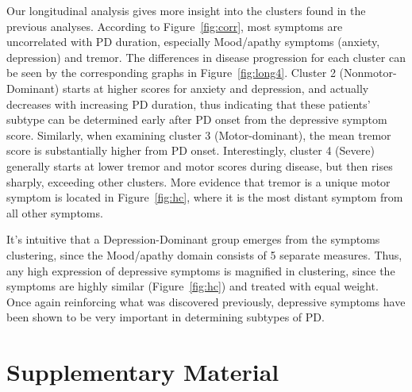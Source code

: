 \documentclass[preprint,5p]{elsarticle} %
\begin{document}
Our longitudinal analysis gives more insight into the clusters found in the previous analyses.
According to Figure~\ref{fig:corr}, most symptoms are uncorrelated with PD duration, especially
Mood/apathy symptoms (anxiety, depression) and tremor.
The differences in disease progression for each cluster can be seen by the corresponding graphs in
Figure~\ref{fig:long4}. Cluster 2 (Nonmotor-Dominant) starts at higher
scores for anxiety and depression, and actually decreases with increasing PD duration, thus indicating that these patients' subtype can be determined
early after PD onset from the depressive symptom score. Similarly, when examining cluster 3
(Motor-dominant), the mean tremor score is substantially higher from PD onset.
Interestingly, cluster 4 (Severe) generally starts at lower tremor and motor scores during disease,
but then rises sharply, exceeding other clusters. More evidence that tremor is a unique motor
symptom is located in Figure~\ref{fig:hc}, where it is the most distant symptom from all other
symptoms.



It's intuitive that a Depression-Dominant group emerges from the symptoms clustering, since the
Mood/apathy domain consists of 5 separate measures. Thus, any high expression of depressive
symptoms is magnified in clustering, since the symptoms are highly similar (Figure~\ref{fig:hc})
and treated with equal weight. Once again reinforcing what was discovered previously, depressive
symptoms have been shown to be very important in determining subtypes of PD.

\section{Supplementary Material}
\end{document}
